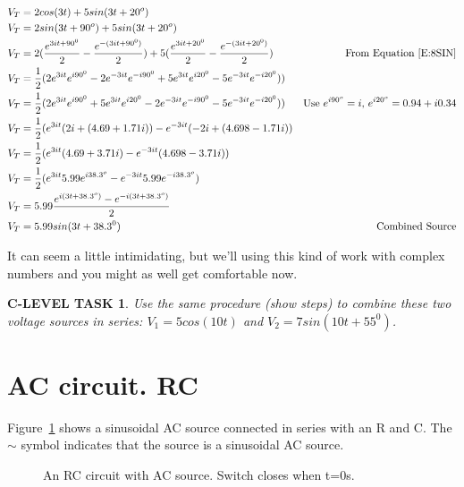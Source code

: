 \documentclass{book}
\numberwithin{equation}{section}
\newtheorem{clevel}{C-LEVEL TASK}
\theoremstyle{definition}
\begin{document}
\begin{align*}
V_T&=2cos(3 t)+5sin(3 t+20^o)\\
V_T&=2sin(3 t+90^o)+5sin(3 t+20^o)\\
V_T&=2(\frac{e^{3it+90^0}}{2}-\frac{e^{-(3it+90^0)}}{2})
		+5(\frac{e^{3it+20^0}}{2}-\frac{e^{-(3it+20^0)}}{2})&\text{From Equation~\eqref{E:8SIN}}\\
V_T&=\frac{1}{2}(2e^{3it}e^{i90^0}-2e^{-3it}e^{-i90^0}
		+5e^{3it}e^{i20^0}-5e^{-3it}e^{-i20^0}))\\
V_T&=\frac{1}{2}(2e^{3it}e^{i90^0}+5e^{3it}e^{i20^0}-2e^{-3it}e^{-i90^0}-5e^{-3it}e^{-i20^0}))
	&\text{Use $e^{i90^o}=i$, $e^{i20^o}=0.94+i0.34$}\\
V_T&=\frac{1}{2}(e^{3it}(2i+(4.69+1.71i))-e^{-3it}(-2i+(4.698-1.71i))\\
V_T&=\frac{1}{2}(e^{3it}(4.69+3.71i)-e^{-3it}(4.698-3.71i))\\
V_T&=\frac{1}{2}(e^{3it}5.99e^{i38.3^o}-e^{-3it}5.99e^{-i38.3^o})\\
V_T&=5.99\frac{e^{i(3t+38.3^o)}-e^{-i(3t+38.3^o)}}{2}\\
V_T&=5.99sin(3t+38.3^0) &\text{Combined Source}
\end{align*}

It can seem a little intimidating, but we'll using this kind of work with complex numbers and you might as well get comfortable now.

\begin{clevel}
Use the same procedure (show steps) to combine these two voltage sources in series: $V_1=5cos(10t)$ and $V_2=7sin(10t+55^0)$.
\end{clevel}


\section{AC circuit. RC}
Figure~\ref{F:8RC} shows a sinusoidal AC source connected in series with an R and C. The $\sim$ symbol indicates that the source is a sinusoidal AC source.

\begin{figure}[H]
\begin{center}
\caption{An RC circuit with AC source. Switch closes when t=0s.}
\label{F:8RC}
\end{center}
\end{figure}
\end{document}
